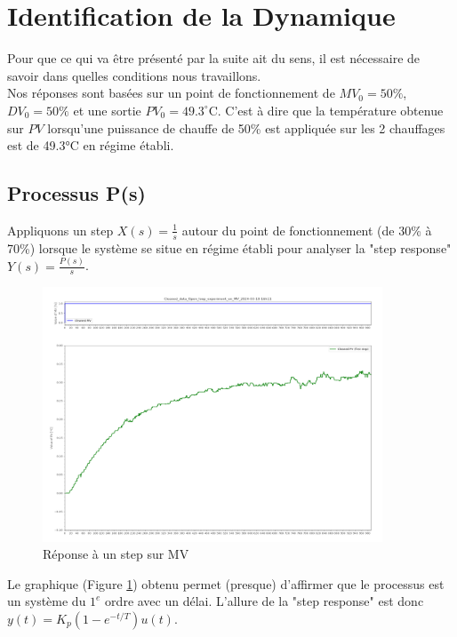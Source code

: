 \section{Identification de la Dynamique}

Pour que ce qui va être présenté par la suite ait du sens, il est nécessaire de savoir dans quelles conditions nous travaillons.\\
Nos réponses sont basées sur un point de fonctionnement de $MV_0 = 50\%$, $DV_0 = 50\%$ et une sortie $PV_0 = 49.3^{\circ}$C. 
C'est à dire que la température obtenue sur $PV$ lorsqu'une puissance de chauffe de 50\% est appliquée sur les 2 chauffages est de 49.3°C en régime établi.

\subsection{Processus P(s)}

Appliquons un step $X(s) = \frac{1}{s}$ autour du point de fonctionnement (de 30\% à 70\%) lorsque le système se situe en régime établi pour analyser la "step response" $Y(s) = \frac{P(s)}{s}$.
\begin{figure}[h]
    \centering
    \includegraphics[width=0.9\textwidth]{../Plots/Graphical_methods_Cleaned_data_Open_loop_experiment_on_MV_2024-03-18-16h11.png}
    \caption{Réponse à un step sur MV}
    \label{fig:MV_step_response}
\end{figure}

Le graphique (Figure \ref{fig:MV_step_response}) obtenu permet (presque) d'affirmer que le processus est un système du $1^{e}$ ordre avec un délai. L'allure de la "step response" est donc $y(t) = K_p (1-e^{-t/T})u(t)$.

